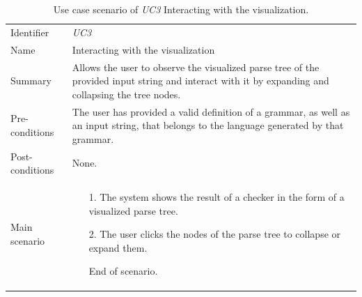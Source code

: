 \documentclass[english,engineering]{wizthesis}
\begin{document}
\begin{xltabular}{\textwidth}{@{}L{3cm}X@{}}
  \caption{Use case scenario of \emph{UC3} Interacting with the visualization.}
  \label{tab:uc3-scenario}\\
  \toprule
  \endfirsthead
  \endhead
  \endfoot
  \endlastfoot
  Identifier & \emph{UC3} \\
  \addlinespace[0.5em] Name & Interacting with the visualization \\
  \addlinespace[0.5em] Summary & Allows the user to observe the visualized parse
  tree of the provided input string and interact with it by expanding and
  collapsing the tree nodes. \\
  \addlinespace[0.5em] Pre-conditions & The user has provided a valid definition
  of a grammar, as well as an input string, that belongs to the language
  generated by that grammar. \\
  \addlinespace[0.5em] Post-conditions & None. \\
  \addlinespace[0.5em] Main scenario &
  \begin{enumerate}[noitemsep,nolistsep,labelindent=0.5cm,align=right]
    \item [1.] The system shows the result of a checker in the form of a
    visualized parse tree.
    \item [2.] The user clicks the nodes of the parse tree to collapse or
    expand them.
    \item [] End of scenario.
  \end{enumerate} \\* \bottomrule
\end{xltabular}
\end{document}
